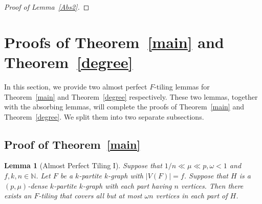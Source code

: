 \documentclass[11pt,a4paper]{article}
\newtheorem{lemma}[thm]{Lemma}
\theoremstyle{definition}
\begin{document}
\begin{proof}[Proof of Lemma~\ref{Abs2}]


\end{proof}








\section{Proofs of Theorem~\ref{main} and Theorem~\ref{degree}}

In this section, we provide two almost perfect $F$-tiling lemmas for Theorem~\ref{main} and Theorem~\ref{degree} respectively. These two lemmas, together with the absorbing lemmas, will complete the proofs of Theorem~\ref{main} and Theorem~\ref{degree}. We split them into two separate subsections.

\subsection{Proof of Theorem~\ref{main}}
\begin{lemma}[Almost Perfect Tiling I]\label{Almost-factor}
Suppose that $1/n \ll \mu \ll p,\omega <1$ and $f,k,n\in \mathbb{N}$. Let $F$ be a $k$-partite $k$-graph with $|V(F)|=f$. Suppose that $H$ is a $(p,\mu)$-dense $k$-partite $k$-graph with each part having $n$ vertices. Then there exists an $F$-tiling that covers all but at most $\omega n$ vertices in each part of $H$.
\end{lemma}
\end{document}
